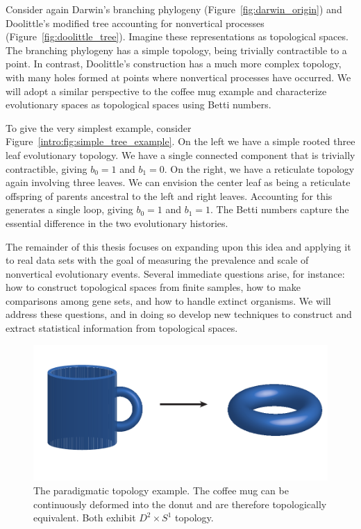 Consider again Darwin's branching phylogeny (Figure~\ref{fig:darwin_origin}) and Doolittle's modified tree accounting for nonvertical processes (Figure~\ref{fig:doolittle_tree}).
Imagine these representations as topological spaces.
The branching phylogeny has a simple topology, being trivially contractible to a point.
In contrast, Doolittle's construction has a much more complex topology, with many holes formed at points where nonvertical processes have occurred.
We will adopt a similar perspective to the coffee mug example and characterize evolutionary spaces as topological spaces using Betti numbers.

To give the very simplest example, consider Figure~\ref{intro:fig:simple_tree_example}.
On the left we have a simple rooted three leaf evolutionary topology.
We have a single connected component that is trivially contractible, giving $b_0=1$ and $b_1=0$.
On the right, we have a reticulate topology again involving three leaves.
We can envision the center leaf as being a reticulate offspring of parents ancestral to the left and right leaves.
Accounting for this generates a single loop, giving $b_0=1$ and $b_1=1$.
The Betti numbers capture the essential difference in the two evolutionary histories.

The remainder of this thesis focuses on expanding upon this idea and applying it to real data sets with the goal of measuring the prevalence and scale of nonvertical evolutionary events.
Several immediate questions arise, for instance: how to construct topological spaces from finite samples, how to make comparisons among gene sets, and how to handle extinct organisms.
We will address these questions, and in doing so develop new techniques to construct and extract statistical information from topological spaces.

\begin{figure}[t]
\centering
\includegraphics[width=\columnwidth]{./fig/introduction/coffeemug_to_donut.pdf}
\caption[The coffee mug and the donut]{The paradigmatic topology example. The coffee mug can be continuously deformed into the donut and are therefore topologically equivalent. Both exhibit $D^2\times S^1$ topology.}
\label{intro:fig:coffeemug_to_donut}
\end{figure}

